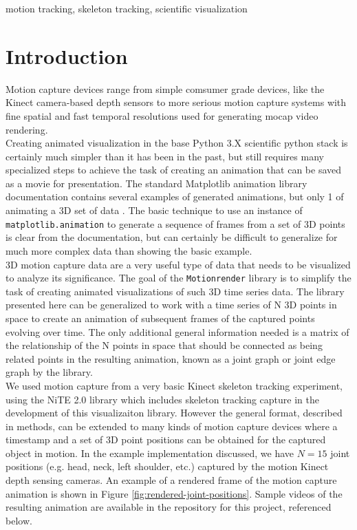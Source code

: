 \documentclass[10pt,a4paper]{article}
\begin{document}
motion tracking, skeleton tracking, scientific visualization

\clearpage
\pagestyle{fancy}
\section*{Introduction}

Motion capture devices range from simple comsumer grade devices, like
the Kinect camera-based depth sensors \cite{pfister-2014, napoli-2017}
to more serious motion capture systems \cite{bregler-2007,menolotto-2020}
with fine spatial and fast temporal resolutions used
for generating mocap video rendering.
\\

Creating animated visualization in the base Python 3.X scientific
python stack is certainly much simpler than it has been in the past,
but still requires many specialized steps to achieve the task of
creating an animation that can be saved as a movie for presentation.
The standard Matplotlib animation library documentation
\cite{matplotlib-animation-2022} contains several examples of
generated animations, but only 1 of animating a 3D set of data
\cite{matplotlib-3d-random-walk-2022}.  The basic technique to use an
instance of \verb|matplotlib.animation| to generate a sequence of frames
from a set of 3D points is clear from the documentation, but can
certainly be difficult to generalize for much more complex data than
showing the basic example.
\\

3D motion capture data are a very useful type of data that needs to be
visualized to analyze its significance.  The goal of the
\verb|Motionrender| library is to simplify the task of creating
animated visualizations of such 3D time series data.  The library
presented here can be generalized to work with a time series of N 3D
points in space to create an animation of subsequent frames of the
captured points evolving over time.  The only additional general
information needed is a matrix of the relationship of the N points in
space that should be connected as being related points in the
resulting animation, known as a joint graph or joint edge graph
by the library.
\\

We used motion capture from a very basic Kinect skeleton tracking
experiment, using the NiTE 2.0 library \cite{nite-2.0-2022,
  nuitrack-2022} which includes skeleton tracking capture in the
development of this visualizaiton library.  However the general
format, described in methods, can be extended to many kinds of motion
capture devices where a timestamp and a set of 3D point positions can
be obtained for the captured object in motion.  In the example
implementation discussed, we have $N = 15$ joint positions (e.g. head,
neck, left shoulder, etc.) captured by the motion Kinect depth sensing
cameras.  An example of a rendered frame of the motion capture
animation is shown in Figure \ref{fig:rendered-joint-positions}.
Sample videos of the resulting animation are available in the
repository for this project, referenced below.
\\
\end{document}
